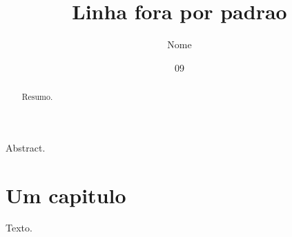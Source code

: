 \documentclass[dsc]{ufrj}
\title{Linha fora por padrao}
\author{Nome}{Sobrenome}
\date{09}{2026}
\begin{document}
  \maketitle
  \frontmatter
  \begin{abstract}Resumo.\end{abstract}
  \begin{foreignabstract}Abstract.\end{foreignabstract}
  \tableofcontents
  \mainmatter
  \chapter{Um capitulo}
  Texto.
\end{document}

